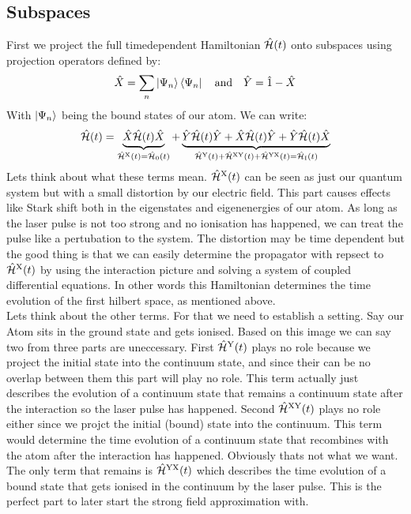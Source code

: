 \subsection{Subspaces}
First we project the full timedependent Hamiltonian $\hat{\mathcal{H}}(t)$ onto subspaces using projection operators defined by:
\begin{equation*}
    \hat{X} = \sum_{n}\ket{\Psi_n}\bra{\Psi_n}\quad\text{and}\quad\hat{Y}= \hat{1} - \hat{X}
\end{equation*}
With $\ket{\Psi_n}$ being the bound states of our atom. We can write:
\begin{equation*}
    \hat{\mathcal{H}}(t) = \underbrace{\hat{X}\hat{\mathcal{H}}(t)\hat{X}}_{\hat{\mathcal{H}}^{\mathrm{X}}(t)=\hat{\mathcal{H}}_{\mathrm{0}}(t)} + \underbrace{\hat{Y}\hat{\mathcal{H}}(t)\hat{Y} + \hat{X}\hat{\mathcal{H}}(t)\hat{Y} + \hat{Y}\hat{\mathcal{H}}(t)\hat{X}}_{\hat{\mathcal{H}}^{\mathrm{Y}}(t)+\hat{\mathcal{H}}^{\mathrm{XY}}(t)+\hat{\mathcal{H}}^{\mathrm{YX}}(t)=\hat{\mathcal{H}}_{\mathrm{I}}(t)}
\end{equation*}
Lets think about what these terms mean. $\hat{\mathcal{H}}^{\mathrm{X}}(t)$ can be seen as just our quantum system but with a small distortion by our electric field. 
This part causes effects like Stark shift both in the eigenstates and eigenenergies of our atom. 
As long as the laser pulse is not too strong and no ionisation has happened, we can treat the pulse like a pertubation to the system.
The distortion may be time dependent but the good thing is that we can easily determine the propagator with repsect to $\hat{\mathcal{H}}^{\mathrm{X}}(t)$ by using the interaction picture and solving a system of coupled differential equations.
In other words this Hamiltonian determines the time evolution of the first hilbert space, as mentioned above. \\
Lets think about the other terms. For that we need to establish a setting. Say our Atom sits in the ground state and gets ionised. 
Based on this image we can say two from three parts are uneccessary. First $\hat{\mathcal{H}}^{\mathrm{Y}}(t)$ plays no role because we project the initial state into the continuum state, and since their can be no overlap between them this part will play no role.
This term actually just describes the evolution of a continuum state that remains a continuum state after the interaction so the laser pulse has happened.
Second $\hat{\mathcal{H}}^{\mathrm{XY}}(t)$ plays no role either since we projct the initial (bound) state into the continuum. 
This term would determine the time evolution of a continuum state that recombines with the atom after the interaction has happened.
Obviously thats not what we want. 
The only term that remains is $\hat{\mathcal{H}}^{\mathrm{YX}}(t)$ which describes the time evolution of a bound state that gets ionised in the continuum by the laser pulse.
This is the perfect part to later start the strong field approximation with.\\





